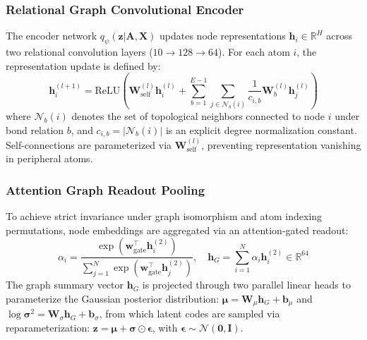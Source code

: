 \documentclass[10pt,a4paper]{article}
\begin{document}
\subsubsection*{Relational Graph Convolutional Encoder}
The encoder network $q_\psi(\mathbf{z} | \mathbf{A}, \mathbf{X})$ updates node representations $\mathbf{h}_i \in \mathbb{R}^{H}$ across two relational convolution layers ($10 \to 128 \to 64$). For each atom $i$, the representation update is defined by:
\begin{equation}
\mathbf{h}_i^{(l+1)} = \text{ReLU}\left( \mathbf{W}_{\text{self}}^{(l)} \mathbf{h}_i^{(l)} + \sum_{b=1}^{E-1} \sum_{j \in \mathcal{N}_b(i)} \frac{1}{c_{i,b}} \mathbf{W}_b^{(l)} \mathbf{h}_j^{(l)} \right)
\end{equation}
where $\mathcal{N}_b(i)$ denotes the set of topological neighbors connected to node $i$ under bond relation $b$, and $c_{i,b} = |\mathcal{N}_b(i)|$ is an explicit degree normalization constant. Self-connections are parameterized via $\mathbf{W}_{\text{self}}^{(l)}$, preventing representation vanishing in peripheral atoms.

\subsubsection*{Attention Graph Readout Pooling}
To achieve strict invariance under graph isomorphism and atom indexing permutations, node embeddings are aggregated via an attention-gated readout:
\begin{equation}
\alpha_i = \frac{\exp(\mathbf{w}_{\text{gate}}^\top \mathbf{h}_i^{(2)})}{\sum_{j=1}^N \exp(\mathbf{w}_{\text{gate}}^\top \mathbf{h}_j^{(2)})}, \quad \mathbf{h}_G = \sum_{i=1}^N \alpha_i \mathbf{h}_i^{(2)} \in \mathbb{R}^{64}
\end{equation}
The graph summary vector $\mathbf{h}_G$ is projected through two parallel linear heads to parameterize the Gaussian posterior distribution: $\boldsymbol{\mu} = \mathbf{W}_\mu \mathbf{h}_G + \mathbf{b}_\mu$ and $\log\boldsymbol{\sigma}^2 = \mathbf{W}_\sigma \mathbf{h}_G + \mathbf{b}_\sigma$, from which latent codes are sampled via reparameterization: $\mathbf{z} = \boldsymbol{\mu} + \boldsymbol{\sigma} \odot \boldsymbol{\epsilon}$, with $\boldsymbol{\epsilon} \sim \mathcal{N}(\mathbf{0}, \mathbf{I})$.
\end{document}
